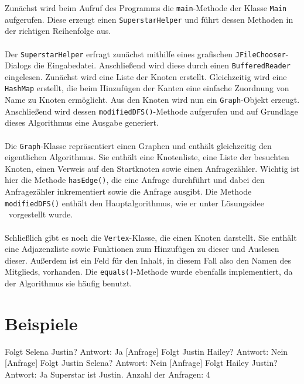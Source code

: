 \documentclass[a4paper, notitlepage, 12pt]{scrartcl}
\begin{document}
Zunächst wird beim Aufruf des Programms die \texttt{main}-Methode der Klasse \texttt{Main} aufgerufen. Diese erzeugt einen \texttt{SuperstarHelper} und führt dessen Methoden in der richtigen Reihenfolge aus. \\ \\
Der \texttt{SuperstarHelper} erfragt zunächst mithilfe eines grafischen \texttt{JFileChooser}-Dialogs die Eingabedatei. Anschließend wird diese durch einen \texttt{BufferedReader} eingelesen. Zunächst wird eine Liste der Knoten erstellt. Gleichzeitig wird eine \texttt{HashMap} erstellt, die beim Hinzufügen der Kanten eine einfache Zuordnung von Name zu Knoten ermöglicht. Aus den Knoten wird nun ein \texttt{Graph}-Objekt erzeugt. Anschließend wird dessen \texttt{modifiedDFS()}-Methode aufgerufen und auf Grundlage dieses Algorithmus eine Ausgabe generiert. \\ \\
Die \texttt{Graph}-Klasse repräsentiert einen Graphen und enthält gleichzeitig den eigentlichen Algorithmus. Sie enthält eine Knotenliste, eine Liste der besuchten Knoten, einen Verweis auf den Startknoten sowie einen Anfragezähler. Wichtig ist hier die Methode \texttt{hasEdge()}, die eine Anfrage durchführt und dabei den Anfragezähler inkrementiert sowie die Anfrage ausgibt. Die Methode \texttt{modifiedDFS()} enthält den Hauptalgorithmus, wie er unter \glqq Lösungsidee \grqq ~vorgestellt wurde. \\ \\
Schließlich gibt es noch die \texttt{Vertex}-Klasse, die einen Knoten darstellt. Sie enthält eine Adjazenzliste sowie Funktionen zum Hinzufügen zu dieser und Auslesen dieser. Außerdem ist ein Feld für den Inhalt, in diesem Fall also den Namen des Mitglieds, vorhanden. Die \texttt{equals()}-Methode wurde ebenfalls implementiert, da der Algorithmus sie häufig benutzt.

\section{Beispiele}
 \begin{MyVerbatim}
 [Anfrage] Folgt Selena Justin? Antwort: Ja
 [Anfrage] Folgt Justin Hailey? Antwort: Nein
 [Anfrage] Folgt Justin Selena? Antwort: Nein
 [Anfrage] Folgt Hailey Justin? Antwort: Ja
 Superstar ist Justin.
 Anzahl der Anfragen: 4
 \end{MyVerbatim}
\end{document}
